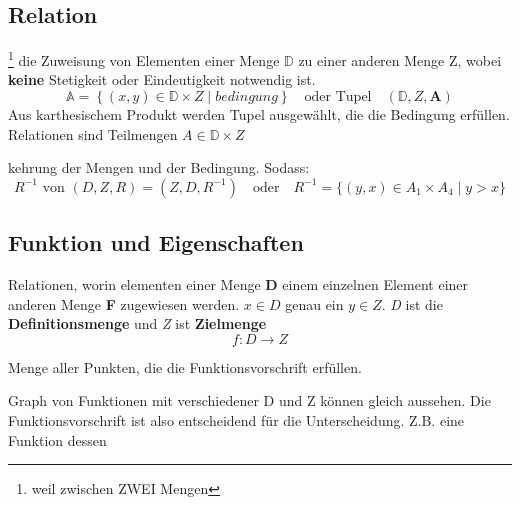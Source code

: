 \pagebreak
{}
\subsection{Relation}
\begin{definition}
    \footnote{weil zwischen ZWEI Mengen} die Zuweisung von Elementen einer Menge $\mathbb{D}$ zu einer anderen Menge Z, wobei \textbf{keine} Stetigkeit oder Eindeutigkeit notwendig ist.
    \begin{equation}
        \mathbb{A} = \left\{(x,y) \in \mathbb{D} \times Z \mid \textit{bedingung}\right\} \quad\text{oder Tupel}\quad (\mathbb{D}, Z, \textbf{A})
    \end{equation}
    Aus karthesischem Produkt werden Tupel ausgewählt, die die Bedingung erfüllen. Relationen sind Teilmengen $A \in \mathbb{D} \times Z$
\end{definition}

\begin{definition}
    [Umkehrrelation] kehrung der Mengen und der Bedingung. Sodass:
    \begin{equation}
        R^{-1} \text{ von } (D,Z,R) = (Z,D,R^{-1}) \quad \text{oder} \quad R^{-1} = \{(y,x)  \in A_1 \times A_4 \mid y > x\}
    \end{equation}
\end{definition}

\subsection{Funktion und Eigenschaften}
\begin{definition}
    [Funktion] Relationen, worin elementen einer Menge \textbf{D}  einem einzelnen Element einer anderen Menge \textbf{F} zugewiesen werden. $x \in D$ genau ein $y \in Z$. \textit{D} ist die \textbf{Definitionsmenge} und \textit{Z} ist \textbf{Zielmenge}
    \begin{equation}
        f: \textit{D} \rightarrow Z 
    \end{equation}
\end{definition}

\begin{definition}
     Menge aller Punkten, die die Funktionsvorschrift erfüllen.
\end{definition}

Graph von Funktionen mit verschiedener D und Z können gleich aussehen. Die Funktionsvorschrift ist also entscheidend für die Unterscheidung. Z.B. eine Funktion dessen 

